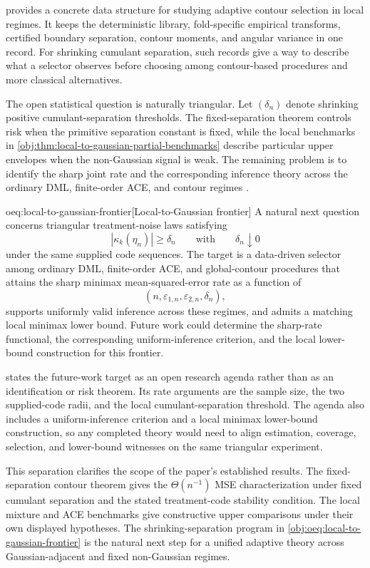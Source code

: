  provides a concrete data structure for studying adaptive contour selection in local regimes. It keeps the deterministic library, fold-specific empirical transforms, certified boundary separation, contour moments, and angular variance in one record. For shrinking cumulant separation, such records give a way to describe what a selector observes before choosing among contour-based procedures and more classical alternatives.

The open statistical question is naturally triangular. Let \((\delta_n)\) denote shrinking positive cumulant-separation thresholds. The fixed-separation theorem controls risk when the primitive separation constant is fixed, while the local benchmarks in \cref{obj:thm:local-to-gaussian-partial-benchmarks} describe particular upper envelopes when the non-Gaussian signal is weak. The remaining problem is to identify the sharp joint rate and the corresponding inference theory across the ordinary DML, finite-order ACE, and contour regimes \citep{ChernozhukovEtAl2018DML,NeweyRobins2018,MackeySyrgkanisZadik2018,JinMackeySyrgkanis2025,LeeMesters2024,HoeschLeeMesters2024}.

\begin{remarkv}{oeq:local-to-gaussian-frontier}[Local-to-Gaussian frontier]
A natural next question concerns triangular treatment-noise laws satisfying
\[
|\kappa_k(\eta_n)|\ge\delta_n
\qquad\text{with}\qquad
\delta_n\downarrow0
\]
under the same supplied code sequences. The target is a data-driven selector among ordinary DML, finite-order ACE, and global-contour procedures that attains the sharp minimax mean-squared-error rate as a function of
\[
(n,\varepsilon_{1,n},\varepsilon_{2,n},\delta_n),
\]
supports uniformly valid inference across these regimes, and admits a matching local minimax lower bound. Future work could determine the sharp-rate functional, the corresponding uniform-inference criterion, and the local lower-bound construction for this frontier.
\end{remarkv}

 states the future-work target as an open research agenda rather than as an identification or risk theorem. Its rate arguments are the sample size, the two supplied-code radii, and the local cumulant-separation threshold. The agenda also includes a uniform-inference criterion and a local minimax lower-bound construction, so any completed theory would need to align estimation, coverage, selection, and lower-bound witnesses on the same triangular experiment.

This separation clarifies the scope of the paper's established results. The fixed-separation contour theorem gives the \(\Theta(n^{-1})\) MSE characterization under fixed cumulant separation and the stated treatment-code stability condition. The local mixture and ACE benchmarks give constructive upper comparisons under their own displayed hypotheses. The shrinking-separation program in \cref{obj:oeq:local-to-gaussian-frontier} is the natural next step for a unified adaptive theory across Gaussian-adjacent and fixed non-Gaussian regimes.
